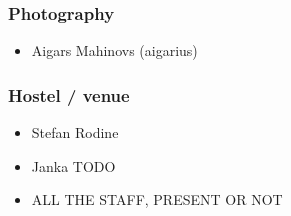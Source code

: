 \documentclass[t]{beamer}
\begin{document}
\begin{frame}
	\frametitle{Photography}
	\begin{itemize}
		\item Aigars Mahinovs (aigarius)
	\end{itemize}
\end{frame}

\begin{frame}
	\frametitle{Hostel / venue}
	\begin{itemize}
		\item Stefan Rodine
		\item Janka TODO
		\item ALL THE STAFF, PRESENT OR NOT
	\end{itemize}
\end{frame}
\end{document}
